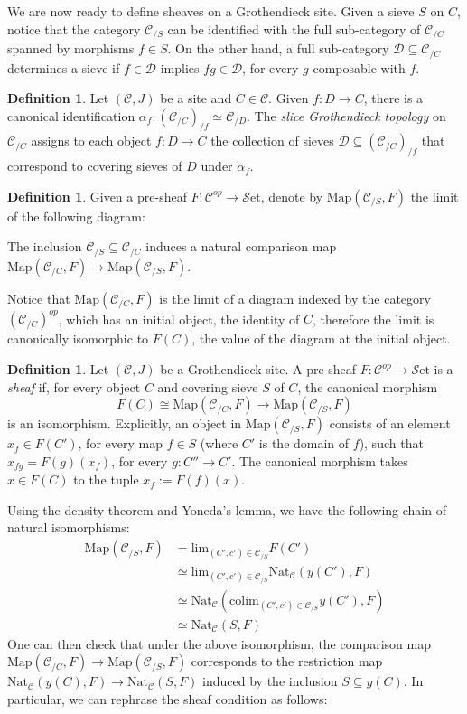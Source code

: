 \documentclass[10pt]{amsart}
\newcommand{\C}{\mathscr{C}}
\newcommand{\D}{\mathscr{D}}
\newcommand{\Map}{\mathrm{Map}}
\newcommand{\set}{\mathscr{S}\mathrm{et}}
\newcommand{\Nat}{\mathrm{Nat}}
\newcommand{\colim}{\mathrm{colim}}
\theoremstyle{definition}
\newtheorem{definition}[equation]{Definition}
\theoremstyle{remark}
\numberwithin{equation}{section}
\begin{document}
	We are now ready to define sheaves on a Grothendieck site. Given a sieve $S$ on $C$, notice that the category $\C_{/S}$ can be identified with the full sub-category of $\C_{/C}$ spanned by morphisms $f\in S$. On the other hand, a full sub-category $\D\subseteq\C_{/C}$ determines a sieve if $f\in\D$ implies $fg\in\D$, for every $g$ composable with $f$. 
	\begin{definition}\label{def:slicetop}
		Let $(\C,J)$ be a site and $C\in\C$. Given $f:D\to C$, there is a canonical identification $\alpha_f:(\C_{/C})_{/f}\simeq\C_{/D}$. The \emph{slice Grothendieck topology} on $\C_{/C}$ assigns to each object $f:D\to C$ the collection of sieves $\D\subseteq(\C_{/C})_{/f}$ that correspond to covering sieves of $D$ under $\alpha_f$. 
	\end{definition}
	\begin{definition}\label{map}
		Given a pre-sheaf $F\colon \C^{op}\to\set$, denote by $\Map(\C_{/S},F)$ the limit of the following diagram:
	\begin{center}
	\end{center}The inclusion $\C_{/S}\subseteq\C_{/C}$ induces a natural \textnormal{comparison map} $\Map(\C_{/C},F)\to\Map(\C_{/S},F)$.
	\end{definition}
	 Notice that $\Map(\C_{/C},F)$ is the limit of a diagram indexed by the category $(\C_{/C})^{op}$, which has an initial object, the identity of $C$, therefore the limit is canonically isomorphic to $F(C)$, the value of the diagram at the initial object.
	\begin{definition}
		Let $(\C, J)$ be a Grothendieck site. A {pre-sheaf} $F : \C^{op} \to \set$ is a \emph{sheaf} if, for every object $C$ and covering sieve $S$ of $C$, the canonical morphism
		\[ F(C)\cong\Map(\C_{/C},F) \to \Map(\C_{/S},F)\]
		is an isomorphism. Explicitly, an object in $\Map(\C_{/S},F)$ consists of an element $x_f\in F(C')$, for every map $f\in S$ (where $C'$ is the domain of $f$), such that $x_{fg}=F(g)(x_f)$, for every $g\colon C''\to C'$. The canonical morphism takes $x\in F(C)$ to the tuple $x_f:=F(f)(x)$. 
	\end{definition}Using the density theorem and Yoneda's lemma, we have the following chain of natural isomorphisms:
	\begin{align*}
		\Map(\C_{/S},F) &= \textrm{lim}_{(C',c')\in\C_{/S}}F(C') \\
		&\simeq \textrm{lim}_{(C',c')\in\C_{/S}}\Nat_\C(y(C'),F) \\
		&\simeq \Nat_\C(\colim_{(C',c')\in\C_{/S}}y(C'),F)\\
		&\simeq \Nat_\C(S,F)
	\end{align*}One can then check that under the above isomorphism, the comparison map $\Map(\C_{/C},F)\to\Map(\C_{/S},F)$ corresponds to the restriction map $\Nat_\C(y(C),F)\to\Nat_\C(S,F)$ induced by the inclusion $S\subseteq y(C)$. In particular, we can rephrase the sheaf condition as follows:
\end{document}

